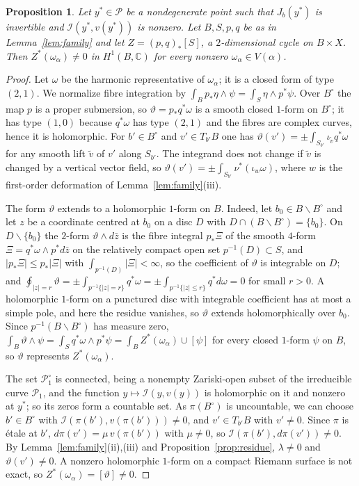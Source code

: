 \documentclass[11pt]{amsart}
\newtheorem{proposition}[theorem]{Proposition}
\theoremstyle{definition}
\theoremstyle{remark}
\numberwithin{equation}{section}
\newcommand{\C}{\mathbb{C}}
\newcommand{\cP}{\mathcal{P}}
\newcommand{\cI}{\mathcal{I}}
\newcommand{\sm}{\smallsetminus}
\begin{document}
\begin{proposition}\label{prop:cylinder}
Let $y^*\in\cP$ be a nondegenerate point such that $J_b(y^*)$ is invertible and $\cI(y^*,v(y^*))$ is nonzero. Let $B,S,p,q$ be as in Lemma~\ref{lem:family} and let $Z=(p,q)_*[S]$, a $2$-dimensional cycle on $B\times X$. Then $Z^*(\omega_\alpha)\ne0$ in $H^1(B,\C)$ for every nonzero $\omega_\alpha\in V(\alpha)$.
\end{proposition}

\begin{proof}
Let $\omega$ be the harmonic representative of $\omega_\alpha$; it is a closed form of type $(2,1)$. We normalize fibre integration by $\int_Bp_*\eta\wedge\psi=\int_S\eta\wedge p^*\psi$. Over $B^\circ$ the map $p$ is a proper submersion, so $\vartheta=p_*q^*\omega$ is a smooth closed $1$-form on $B^\circ$; it has type $(1,0)$ because $q^*\omega$ has type $(2,1)$ and the fibres are complex curves, hence it is holomorphic. For $b'\in B^\circ$ and $v'\in T_{b'}B$ one has $\vartheta(v')=\pm\int_{S_{b'}}\iota_{\tilde v}q^*\omega$ for any smooth lift $\tilde v$ of $v'$ along $S_{b'}$. The integrand does not change if $\tilde v$ is changed by a vertical vector field, so $\vartheta(v')=\pm\int_{S_{b'}}\nu^*(\iota_w\omega)$, where $w$ is the first-order deformation of Lemma~\ref{lem:family}(iii).

The form $\vartheta$ extends to a holomorphic $1$-form on $B$. Indeed, let $b_0\in B\sm B^\circ$ and let $z$ be a coordinate centred at $b_0$ on a disc $D$ with $D\cap(B\sm B^\circ)=\{b_0\}$. On $D\sm\{b_0\}$ the $2$-form $\vartheta\wedge d\bar z$ is the fibre integral $p_*\Xi$ of the smooth $4$-form $\Xi=q^*\omega\wedge p^*d\bar z$ on the relatively compact open set $p^{-1}(D)\subset S$, and $|p_*\Xi|\le p_*|\Xi|$ with $\int_{p^{-1}(D)}|\Xi|<\infty$, so the coefficient of $\vartheta$ is integrable on $D$; and $\oint_{|z|=r}\vartheta=\pm\int_{p^{-1}\{|z|=r\}}q^*\omega=\pm\int_{p^{-1}\{|z|\le r\}}q^*d\omega=0$ for small $r>0$. A holomorphic $1$-form on a punctured disc with integrable coefficient has at most a simple pole, and here the residue vanishes, so $\vartheta$ extends holomorphically over $b_0$. Since $p^{-1}(B\sm B^\circ)$ has measure zero, $\int_B\vartheta\wedge\psi=\int_Sq^*\omega\wedge p^*\psi=\int_BZ^*(\omega_\alpha)\cup[\psi]$ for every closed $1$-form $\psi$ on $B$, so $\vartheta$ represents $Z^*(\omega_\alpha)$.

The set $\cP_1^\circ$ is connected, being a nonempty Zariski-open subset of the irreducible curve $\cP_1$, and the function $y\mapsto\cI(y,v(y))$ is holomorphic on it and nonzero at $y^*$; so its zeros form a countable set. As $\pi(B^\circ)$ is uncountable, we can choose $b'\in B^\circ$ with $\cI(\pi(b'),v(\pi(b')))\ne0$, and $v'\in T_{b'}B$ with $v'\ne0$. Since $\pi$ is \'etale at $b'$, $d\pi(v')=\mu\,v(\pi(b'))$ with $\mu\ne0$, so $\cI(\pi(b'),d\pi(v'))\ne0$. By Lemma~\ref{lem:family}(ii),(iii) and Proposition~\ref{prop:residue}, $\lambda\ne0$ and $\vartheta(v')\ne0$. A nonzero holomorphic $1$-form on a compact Riemann surface is not exact, so $Z^*(\omega_\alpha)=[\vartheta]\ne0$.
\end{proof}
\end{document}
